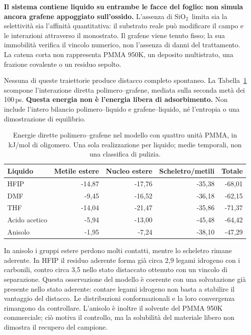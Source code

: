 \documentclass[11pt,reqno]{amsart}
\numberwithin{equation}{section}
\newcommand{\SiO}{\ensuremath{\mathrm{SiO}_2}}
\begin{document}
\textbf{Il sistema contiene liquido su entrambe le facce del foglio:
non simula ancora grafene appoggiato sull'ossido.} L'assenza
di \SiO\ limita sia la selettivit\`a sia l'affinit\`a quantitativa:
il substrato reale pu\`o modificare il campo e le interazioni attraverso
il monostrato. Il grafene viene tenuto fisso; la sua immobilit\`a
verifica il vincolo numerico, non l'assenza di danni del trattamento.
La catena corta non rappresenta PMMA 950K, un deposito multistrato,
una frazione covalente o un residuo sepolto.

Nessuna di queste traiettorie produce distacco completo spontaneo.
La Tabella~\ref{tab:interface} scompone l'interazione diretta
polimero--grafene, mediata sulla seconda met\`a dei 100\,ps.
\textbf{Questa energia non \`e l'energia libera di adsorbimento.}
Non include l'intero bilancio polimero--liquido e grafene--liquido,
n\'e l'entropia o una dimostrazione di equilibrio.

\begin{table}[htbp]\centering\small
\caption{Energie dirette polimero--grafene nel modello con quattro
unit\`a PMMA, in kJ/mol di oligomero. Una sola realizzazione per
liquido; medie temporali, non una classifica di pulizia.}
\label{tab:interface}
\begin{tabular}{lrrrr}\toprule
Liquido & Metile estere & Nucleo estere & Scheletro/metili & Totale\\\midrule
HFIP & -14,87 & -17,76 & -35,38 & -68,01 \\
DMF & -9,45 & -16,52 & -36,18 & -62,15 \\
THF & -14,04 & -21,47 & -35,86 & -71,37 \\
Acido acetico & -5,94 & -13,00 & -45,48 & -64,42 \\
Anisolo & -1,95 & -7,24 & -38,10 & -47,29 \\
\bottomrule\end{tabular}
\end{table}

In anisolo i gruppi estere perdono molti contatti, mentre lo scheletro
rimane aderente. In HFIP il residuo aderente forma gi\`a circa
2,9 legami idrogeno con i carbonili, contro circa 3,5 nello stato
distaccato ottenuto con un vincolo di separazione. Questa osservazione
del modello \`e coerente con una solvatazione gi\`a presente nello
stato aderente: contare legami idrogeno non basta a stabilire il vantaggio
del distacco. Le distribuzioni conformazionali e la loro convergenza
rimangono da controllare. L'anisolo \`e inoltre il solvente del
PMMA 950K commerciale; ci\`o motiva il controllo, ma la solubilit\`a
del materiale libero non dimostra il recupero del campione.
\end{document}
